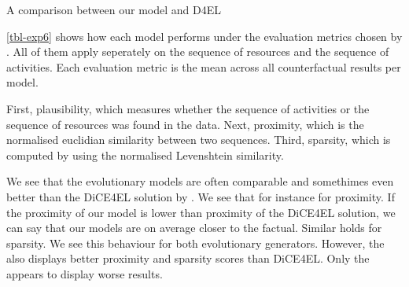 \documentclass[./../../paper.tex]{subfiles}
\begin{document}
\begin{table}
    \centering    
    \resizebox{\linewidth}{!}{
        
        
    }
\caption{A comparison between our model and D4EL}
\label{tbl-exp6}
\end{table}

\autoref{tbl-exp6} shows how each model performs under the evaluation metrics chosen by \citeauthor{hsieh_DiCE4ELInterpretingProcess_2021}. All of them apply seperately on the sequence of resources and the sequence of activities. Each evaluation metric is the mean across all counterfactual results per model.

First, plausibility, which measures whether the sequence of activities or the sequence of resources was found in the data. Next, proximity, which is the normalised euclidian similarity between two sequences. Third, sparsity, which is computed by using the normalised Levenshtein similarity. 

We see that the evolutionary models are often comparable and somethimes even better than the DiCE4EL solution by \citeauthor{hsieh_DiCE4ELInterpretingProcess_2021}. We see that for instance for proximity. If the proximity of our model is lower than proximity of the DiCE4EL solution, we can say that our models are on average closer to the factual. Similar holds for sparsity. We see this behaviour for both evolutionary generators. However, the \ModelCBG also displays better proximity and sparsity scores than DiCE4EL. Only the \ModelRNG appears to display worse results. 





\end{document}
